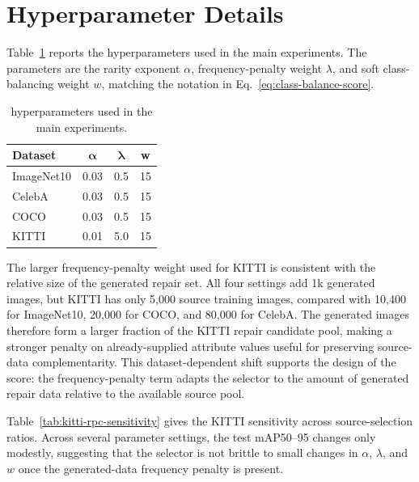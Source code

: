 \section{Hyperparameter Details}
\label{app:hyperparameter-details}
Table~\ref{tab:rpc-hyperparameters} reports the \model hyperparameters used in the main experiments. The parameters are the rarity exponent $\alpha$, frequency-penalty weight $\lambda$, and soft class-balancing weight $w$, matching the notation in Eq.~\ref{eq:class-balance-score}.

\begin{table}[h]
\centering
\caption{\model hyperparameters used in the main experiments.}
\label{tab:rpc-hyperparameters}
\small
\setlength{\tabcolsep}{5pt}
\begin{tabular}{l c c c}
\toprule
\rowcolor{sectiongray} \textbf{Dataset} & $\boldsymbol{\alpha}$ & $\boldsymbol{\lambda}$ & \textbf{w} \\
\midrule
ImageNet10 & 0.03 & 0.5 & 15 \\
CelebA & 0.03 & 0.5 & 15 \\
COCO & 0.03 & 0.5 & 15 \\
KITTI & 0.01 & 5.0 & 15 \\
\bottomrule
\end{tabular}
\end{table}

The larger frequency-penalty weight used for KITTI is consistent with the relative size of the generated repair set. All four settings add 1k generated images, but KITTI has only 5,000 source training images, compared with 10,400 for ImageNet10, 20,000 for COCO, and 80,000 for CelebA. The generated images therefore form a larger fraction of the KITTI repair candidate pool, making a stronger penalty on already-supplied attribute values useful for preserving source-data complementarity. This dataset-dependent shift supports the design of the score: the frequency-penalty term adapts the selector to the amount of generated repair data relative to the available source pool.

Table~\ref{tab:kitti-rpc-sensitivity} gives the KITTI sensitivity across source-selection ratios. Across several \model parameter settings, the test mAP50--95 changes only modestly, suggesting that the selector is not brittle to small changes in $\alpha$, $\lambda$, and $w$ once the generated-data frequency penalty is present.

